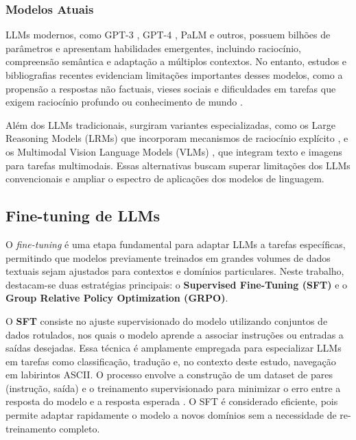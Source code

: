 \subsubsection{Modelos Atuais}

LLMs modernos, como GPT-3 \cite{brown2020languagemodelsfewshotlearners}, GPT-4 \cite{openai2024gpt4technicalreport}, PaLM \cite{chowdhery2022palmscalinglanguagemodeling} e outros, possuem bilhões de parâmetros e apresentam habilidades emergentes, incluindo raciocínio, compreensão semântica e adaptação a múltiplos contextos. No entanto, estudos e bibliografias recentes evidenciam limitações importantes desses modelos, como a propensão a respostas não factuais, vieses sociais e dificuldades em tarefas que exigem raciocínio profundo ou conhecimento de mundo \cite{chang2024lmsurvey, summerfield2025strange}.

Além dos LLMs tradicionais, surgiram variantes especializadas, como os Large Reasoning Models (LRMs) que incorporam mecanismos de raciocínio explícito \cite{lynch2025reasoning}, e os Multimodal Vision Language Models (VLMs) \cite{li2025surveystateartlarge}, que integram texto e imagens para tarefas multimodais. Essas alternativas buscam superar limitações dos LLMs convencionais e ampliar o espectro de aplicações dos modelos de linguagem.

\subsection{Fine-tuning de LLMs}\label{sec:fund-finetuning}

O \textit{fine-tuning} é uma etapa fundamental para adaptar LLMs a tarefas específicas, permitindo que modelos previamente treinados em grandes volumes de dados textuais sejam ajustados para contextos e domínios particulares. Neste trabalho, destacam-se duas estratégias principais: o \textbf{Supervised Fine-Tuning (SFT)} e o \textbf{Group Relative Policy Optimization (GRPO)}.

O \textbf{SFT} consiste no ajuste supervisionado do modelo utilizando conjuntos de dados rotulados, nos quais o modelo aprende a associar instruções ou entradas a saídas desejadas. Essa técnica é amplamente empregada para especializar LLMs em tarefas como classificação, tradução e, no contexto deste estudo, navegação em labirintos ASCII. O processo envolve a construção de um dataset de pares (instrução, saída) e o treinamento supervisionado para minimizar o erro entre a resposta do modelo e a resposta esperada \cite{zhang2024instructiontuning}. O SFT é considerado eficiente, pois permite adaptar rapidamente o modelo a novos domínios sem a necessidade de re-treinamento completo.

